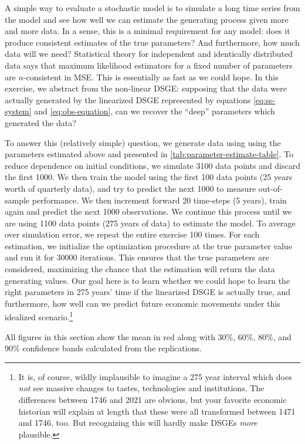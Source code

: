 \documentclass[11pt]{article}
\begin{document}
\label{sec:simulate-estimate}

A simple way to evaluate a stochastic model is to simulate a long time
series from the model and see how well we can estimate the generating
process given more and more data. In a sense, this is a minimal
requirement for any model: does it produce consistent estimates of the
true parameters? And furthermore, how much data will we need?
Statistical theory for independent and identically distributed data says
that maximum likelihood estimators for a fixed number of parameters are
\(n\)-consistent in MSE. This is essentially as fast as we could hope.
In this exercise, we abstract from the non-linear DSGE: supposing that
the data were actually generated by the linearized DSGE represented by
equations \eqref{eq:ss-system} and \eqref{eq:obs-equation}, can we
recover the ``deep'' parameters which generated the data?

To answer this (relatively simple) question, we generate data using
using the parameters estimated above and presented in
\autoref{tab:parameter-estimate-table}. To reduce dependence on initial
conditions, we simulate 3100 data points and discard the first 1000. We
then train the model using the first 100 data points (25 years worth of
quarterly data), and try to predict the next 1000 to measure
out-of-sample performance. We then increment forward 20 time-steps (5
years), train again and predict the next 1000 observations. We continue
this process until we are using 1100 data points (275 years of data) to
estimate the model. To average over simulation error, we repeat the
entire exercise 100 times. For each estimation, we initialize the
optimization procedure at the true parameter value and run it for 30000
iterations. This ensures that the true parameters are considered,
maximizing the chance that the estimation will return the data
generating values. Our goal here is to learn whether we could hope to
learn the right parameters in 275 years' time if the linearized DSGE is
actually true, and furthermore, how well can we predict future economic
movements under this idealized scenario.\footnote{It is, of course,
  wildly implausible to imagine a 275 year interval which does
  \emph{not} see massive changes to tastes, technologies and
  institutions. The differences between 1746 and 2021 are obvious, but
  your favorite economic historian will explain at length that these
  were all transformed between 1471 and 1746, too. But recognizing this
  will hardly make DSGEs \emph{more} plausible.}

All figures in this section show the mean in red along with 30\%, 60\%,
80\%, and 90\% confidence bands calculated from the replications.
\end{document}
